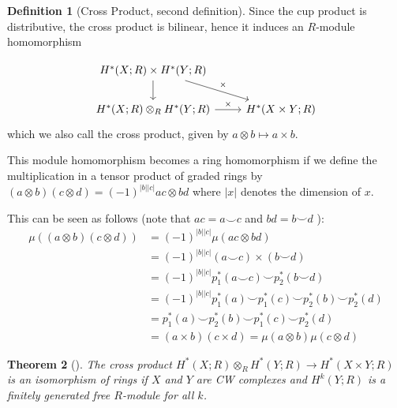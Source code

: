 \documentclass[reqno]{amsart}
\newtheorem{theorem}{Theorem}[section]
\theoremstyle{definition}
\newtheorem{definition}[theorem]{Definition}
\theoremstyle{remark}
\begin{document}
    \begin{definition}[Cross Product, second definition]
    Since the cup product is distributive, the cross
    product is bilinear, hence it induces an
    $R$-module homomorphism

    \begin{equation*}
    \begin{tikzcd}
        H^{*}(X;R) \times H^{*}(Y;R) \ar[dr, "\times "]
        \ar[d] &\\
        H^{*}(X;R) \otimes_R H^{*}(Y;R) 
        \ar[r, "\times "] & H^{*}(X \times Y;R)
    \end{tikzcd}
    \end{equation*}
    which we also call the cross product, given
    by $a \otimes b \mapsto a \times b$.
    \end{definition}

    This module homomorphism becomes
    a ring homomorphism if we define
    the multiplication in a tensor product
    of graded rings by
    $\left( a \otimes b \right) \left( c \otimes d \right) 
    = (-1)^{\left| b \right| \left| c \right| }
    ac \otimes bd$ where
    $\left| x \right| $ denotes the dimension of $x$.
    
    This can be seen as follows (note that
    $ac = a \smile c$ and $bd = b \smile d$ ):
    \begin{align*}
        \mu \left( \left( a \otimes b \right) 
        \left( c \otimes d \right) \right) 
        &= (-1)^{\left| b \right| \left| c \right| }
        \mu \left( ac \otimes bd \right) \\
        &= (-1)^{\left| b \right| \left| c \right| }
        (a \smile c) \times (b \smile d)\\
        &= (-1)^{\left| b \right| \left| c \right| }
        p_1^{*} (a \smile c) \smile
        p_2^{*}\left( b \smile d \right) \\
        &= (-1)^{\left| b \right| \left| c \right| }
        p_1^{*}(a) \smile p_1^{*}(c) \smile
        p_2^{*}(b) \smile p_2^{*}(d)\\
        &= p_1^{*}(a) \smile p_2^{*}(b) \smile
        p_1^{*}(c) \smile p_2^{*}(d)\\
        &= \left( a \times b \right) \left( c
        \times d\right) = \mu (a \otimes b) 
        \mu (c \otimes d)
    \end{align*}



    \begin{theorem}[]
        The cross product $H^{*}(X;R) \otimes_R
        H^{*}(Y;R) \to H^{*}(X \times Y; R)$ is an
        isomorphism of rings
        if $X$ and $Y$ are CW complexes and
        $H^{k}(Y;R)$ is a finitely generated
        free $R$-module for all $k$.
    \end{theorem}
    




\end{document}
